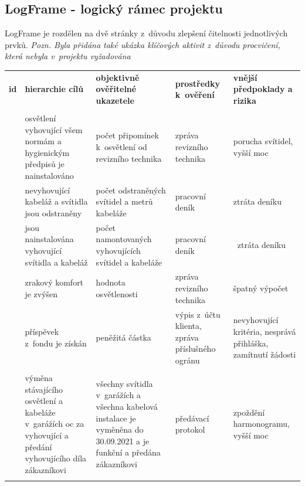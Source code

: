 \documentclass[a4paper, twoside, 11pt]{article}
\begin{document}
	\subsection{LogFrame - logický rámec projektu}\label{sec:logframe}
			LogFrame je rozdělen na dvě stránky z~důvodu zlepšení čitelnosti jednotlivých prvků. \textit{Pozn. Byla přidána také ukázka klíčových aktivit z~důvodu procvičení, která nebyla v~projektu vyžadována}
	\begin{table}[H]
	\centering
		\resizebox{1 \textwidth}{!}
		{
		\begin{tabular}{ !{\vrule width 2pt} p{5cm} | p{5cm} | p{5cm} | p{5cm} | p{5cm} !{\vrule width 2pt} }
	\textbf{id} & \textbf{hierarchie cílů} & \textbf{objektivně ověřitelné ukazetele} & \textbf{prostředky k~ověření} & \textbf{vnější předpoklady a rizika}  \\ 
	    \\ 
	 & osvětlení vyhovující všem normám a hygienickým předpisů je nainstalováno & počet připomínek k~osvětlení od revizního technika & zpráva revizního technika & porucha svítidel, vyšší moc\   \\ \hline
	 & nevyhovující kabeláž a svítidla jsou odstraněny & počet odstraněných svítidel a metrů kabeláže & pracovní deník & ztráta deníku\   \\ \hline
	 & jsou nainstalována vyhovující svítidla a kabeláž & počet namontovaných vyhovujících svítidel a kabeláže  & pracovní deník & \ ztráta deníku
   \\ \hline
	 & zrakový komfort je zvýšen & hodnota osvětlenosti
  & zpráva revizního technika & špatný výpočet \\ \hline
	 & příspěvek z~fondu je získán & peněžitá částka & výpis z~účtu klienta, zpráva příslušného ogránu & nevyhovující kritéria, nesprává přihláška, zamítnutí žádosti\\ 
	   \\ 
	 & výměna stávajícího osvětlení a kabeláže v~garážích oc za vyhovující a předání vyhovujícího díla zákazníkovi & všechny svítidla v~garážích a všechna kabelová instalace je vyměněna do 30.09.2021 a je funkční a předána zákazníkovi & předávací protokol & zpoždění harmonogramu, vyšší moc\\ 

\end{tabular}}
\end{table}
\end{document}
